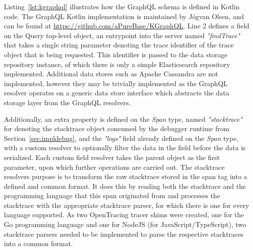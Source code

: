 \documentclass[12pt,pdftex,titlepage]{report}
\begin{document}
            Listing~\ref{lst:kgraphql} illustrates how the GraphQL schema is defined in Kotlin code. The GraphQL Kotlin implementation is maintained by Jógvan Olsen, and can be found at 
            \url{https://github.com/aPureBase/KGraphQL}. Line 2 defines a field on the Query top-level object, an entrypoint into the server named \textit{"findTrace"} that takes a single string parameter 
            denoting the trace identifier of the trace object that is being requested. This identifier is passed to the data storage repository instance, of which there is only a simple Elasticsearch 
            repository implemented. Additional data stores such as Apache Cassandra are not implemented, however they may be trivially implemented as the GraphQL resolver operates on a generic data store 
            interface which abstracts the data storage layer from the GraphQL resolvers.

            Additionally, an extra property is defined on the \textit{Span} type, named \textit{"stacktrace"} for denoting the stacktrace object consumed by the debugger runtime from Section~\ref{sec:impldebug}, 
            and the \textit{"logs"} field already defined on the \textit{Span} type, with a custom resolver to optionally filter the data in the field before the data is serialized. Each custom field resolver takes
            the parent object as the first parameter, upon which further operations are carried out. The stacktrace resolvers purpose is to transform the raw stacktrace stored in the span tag into a defined and common
            format. It does this by reading both the stacktrace and the programming language that this span originated from and processes the stacktrace with the appropriate stacktrace parser, for which there is one
            for every language supported. As two OpenTracing tracer shims were created, one for the Go programming language and one for NodeJS (for JavaScript/TypeScript), two stacktrace parsers needed to be implemented 
            to parse the respective stacktraces into a common format.
\end{document}
